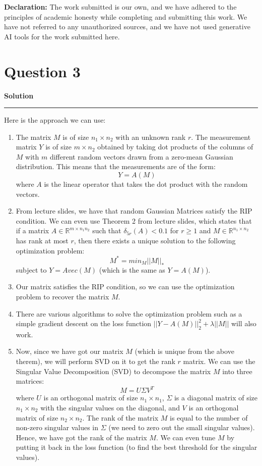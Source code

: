 \documentclass[a4paper,12pt]{article}
\title{\cooltitle{CS754 Assignment-4}}
\author{{\bf Saksham Rathi, Ekansh Ravi Shankar, Kshitij Vaidya}}
\date{}
\newenvironment{solution}[2][]{%
    \begin{mdframed}[linecolor=blue!70!black, linewidth=2pt, roundcorner=10pt, backgroundcolor=yellow!10!white, skipabove=12pt, skipbelow=12pt]%
        \textbf{\large #2}
        \par\noindent\rule{\textwidth}{0.4pt}
}{
    \end{mdframed}
}
\begin{document}
\maketitle
\textbf{Declaration:} The work submitted is our own, and
we have adhered to the principles of academic honesty while completing and submitting this work. We have not referred to any unauthorized sources, and we have not used generative AI tools for the work submitted here.

\section*{Question 3}

\begin{solution}{Solution}
Here is the approach we can use:
\begin{enumerate}
  \item The matrix $M$ is of size $n_1 \times n_2$ with an unknown rank $r$. The measurement matrix $Y$ is of size $m \times n_2$ obtained by taking dot products of the columns of $M$ with $m$ different random vectors drawn from a zero-mean Gaussian distribution. This means that the measurements are of the form:
  \[
  Y = A(M)
  \]
  where $A$ is the linear operator that takes the dot product with the random vectors.
  \item From lecture slides, we have that random Gaussian Matrices satisfy the RIP condition. We can even use Theorem 2 from lecture slides, which states that if a matrix $A \in \mathbb{R}^{m\times n_1n_2}$ such that $\delta_{5r}(A) < 0.1$ for $r \geq 1$ and $M \in \mathbb{R}^{n_1\times n_2}$ has rank at most $r$, then there exists a unique solution to the following optimization problem:
  \[M^* = min_M||M||_*\] 
  subject to $Y = Avec(M)$ (which is the same as $Y = A(M)$).
  \item Our matrix satisfies the RIP condition, so we can use the optimization problem to recover the matrix $M$.
  \item There are various algorithms to solve the optimization problem such as a simple gradient descent on the loss function $||Y - A(M)||_2^2 + \lambda ||M||$ will also work. 
  \item Now, since we have got our matrix $M$ (which is unique from the above therem), we will perform SVD on it to get the rank $r$ matrix. We can use the Singular Value Decomposition (SVD) to decompose the matrix $M$ into three matrices:
  \[ M = U \Sigma V^T \]
  where $U$ is an orthogonal matrix of size $n_1 \times n_1$, $\Sigma$ is a diagonal matrix of size $n_1 \times n_2$ with the singular values on the diagonal, and $V$ is an orthogonal matrix of size $n_2 \times n_2$. The rank of the matrix $M$ is equal to the number of non-zero singular values in $\Sigma$ (we need to zero out the small singular values). Hence, we have got the rank of the matrix $M$. We can even tune $M$ by putting it back in the loss function (to find the best threshold for the singular values).
\end{enumerate}

\end{solution}
\end{document}
